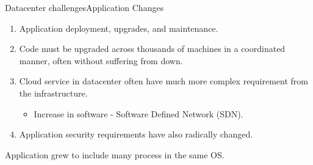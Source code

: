 \documentclass[10pt]{beamer}
\begin{document}
\begin{frame}{Datacenter challenges}{Application Changes}
  \begin{enumerate}
    \item Application deployment, upgrades, and maintenance. \pause
    \item Code must be upgraded across thousands of machines in a coordinated
          manner, often without suffering from down. \pause
    \item Cloud service in datacenter often have much more complex requirement
          from the infrastructure. \pause
     \begin{itemize}
      \item Increase in software - Software Defined Network (SDN). \pause
     \end{itemize}
    \item Application security requirements have also radically changed. \pause
  \end{enumerate}

  \begin{block}{}
    Application grew to include many process in the same OS.
  \end{block}
\end{frame}

\end{document}
